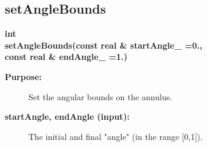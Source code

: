 \subsection{setAngleBounds}
 
\begin{flushleft} \textbf{%
int  \\ 
\settowidth{\AnnulusMappingIncludeArgIndent}{setAngleBounds(}%
setAngleBounds(const real \& startAngle\_  =0., \\ 
\hspace{\AnnulusMappingIncludeArgIndent}const real \& endAngle\_  =1.)
}\end{flushleft}
\begin{description}
\item[{\bf Purpose:}]  Set the angular bounds on the annulus.
\item[{\bf startAngle, endAngle (input):}]  The initial and final "angle" (in the range [0,1]).
\end{description}
